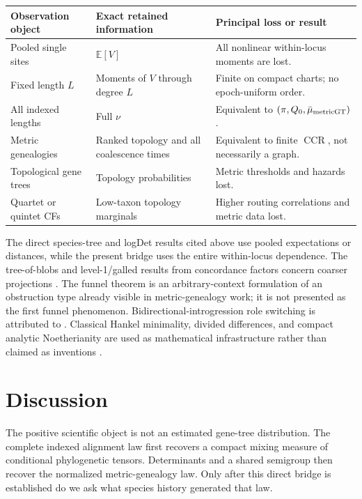 \documentclass[11pt]{article}
\newcommand{\CCR}{\operatorname{CCR}}
\begin{document}
\begin{center}
\begin{tabularx}{\textwidth}{@{}>{\raggedright\arraybackslash}p{}>{\raggedright\arraybackslash}p{}>{\raggedright\arraybackslash}X@{}}
\toprule
Observation object & Exact retained information & Principal loss or result \\
\midrule
Pooled single sites & $\mathbb E[V]$ & All nonlinear within-locus moments are lost. \\
Fixed length $L$ & Moments of $V$ through degree $L$ & Finite on compact charts; no epoch-uniform order. \\
All indexed lengths & Full $\nu$ & Equivalent to $(\pi,Q_0,\bar\mu_{\rm metricGT})$. \\
Metric genealogies & Ranked topology and all coalescence times & Equivalent to finite $\CCR$, not necessarily a graph. \\
Topological gene trees & Topology probabilities & Metric thresholds and hazards lost. \\
Quartet or quintet CFs & Low-taxon topology marginals & Higher routing correlations and metric data lost. \\
\bottomrule
\end{tabularx}
\end{center}

The direct species-tree and logDet results cited above use pooled expectations or distances, while the present bridge uses the entire within-locus dependence.  The tree-of-blobs and level-1/galled results from concordance factors concern coarser projections \citep{AllmanBanosMitchellRhodes2023,AllmanBanosGarroteRhodes2024,AllmanAneBanosRhodes2025}.  The funnel theorem is an arbitrary-context formulation of an obstruction type already visible in metric-genealogy work; it is not presented as the first funnel phenomenon.  Bidirectional-introgression role switching is attributed to \citet{YangFlouri2022}.  Classical Hankel minimality, divided differences, and compact analytic Noetherianity are used as mathematical infrastructure rather than claimed as inventions \citep{Fliess1974,deBoor2005,Frisch1967,Siu1969}.

\section{Discussion}

The positive scientific object is not an estimated gene-tree distribution.  The complete indexed alignment law first recovers a compact mixing measure of conditional phylogenetic tensors.  Determinants and a shared semigroup then recover the normalized metric-genealogy law.  Only after this direct bridge is established do we ask what species history generated that law.
\end{document}
